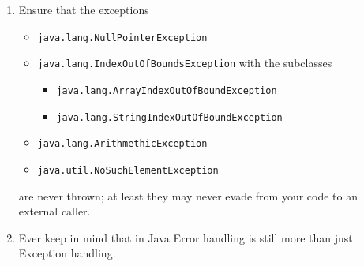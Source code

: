 \begin{enumerate}[label=P\arabic*.]
	\item{Ensure that the exceptions
	\begin{itemize}[nosep]
		\item{\lstinline|java.lang.NullPointerException| \autocite{ORACLE_DOC_NULLPOINTEREXCEPTION_CLASS}}
		\item{\lstinline|java.lang.IndexOutOfBoundsException| \autocite{ORACLE_DOC_INDEXOUTOFBOUNDSEXCEPTION_CLASS}
	with the subclasses
		\begin{itemize}[nosep]
			\item{\lstinline|java.lang.ArrayIndexOutOfBoundException| \autocite{ORACLE_DOC_ARRAYINDEXOUTOFBOUNDSEXCEPTION_CLASS}}
			\item{\lstinline|java.lang.StringIndexOutOfBoundException| \autocite{ORACLE_DOC_STRINGINDEXOUTOFBOUNDSEXCEPTION_CLASS}}
		\end{itemize}}
		\item{\lstinline|java.lang.ArithmethicException| \autocite{ORACLE_DOC_ARITHMETICEXCEPTION_CLASS}}
		\item{\lstinline|java.util.NoSuchElementException| \autocite{ORACLE_DOC_NOSUCHELEMENTEXCEPTION_CLASS}}
	\end{itemize}
	are never thrown; at least they may never evade from your code to an external caller.} 
	
	\item{Ever keep in mind that in Java Error handling is still more than just Exception handling.} 
\end{enumerate}

